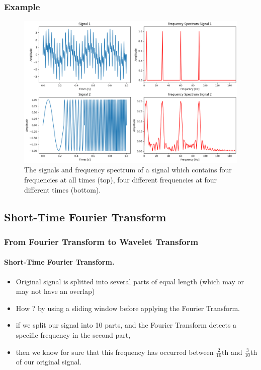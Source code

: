 \documentclass{beamer}
\begin{document}
\begin{frame}
	\frametitle{Example}
	\begin{center}
		\begin{figure}\label{fig4}
			\includegraphics[scale=0.25]{fft_spectra-1.png}
			\caption{ The signals and frequency spectrum of a signal which contains four frequencies at all times (top), four different frequencies at four different times (bottom).}	
		\end{figure}
	\end{center}
	
	
\end{frame}


\subsection{Short-Time Fourier Transform}
\begin{frame}
	\frametitle{From Fourier Transform to Wavelet Transform}
	\framesubtitle{Short-Time Fourier Transform.}
	
	\begin{itemize}
		\item
		Original signal is splitted into several parts of equal length (which may or may not have an overlap)
		
		\item
		How  ? by using a sliding window before applying the Fourier Transform.
		
		\item
		
		if we split our signal into 10 parts, and the Fourier Transform detects a specific frequency in the second part,
		
		\item
		
		then we know for sure that this frequency has occurred between $\frac{2}{10}$th and $\frac{3}{10}$th of our original signal.
		
		
	\end{itemize}
\end{frame}
\end{document}

